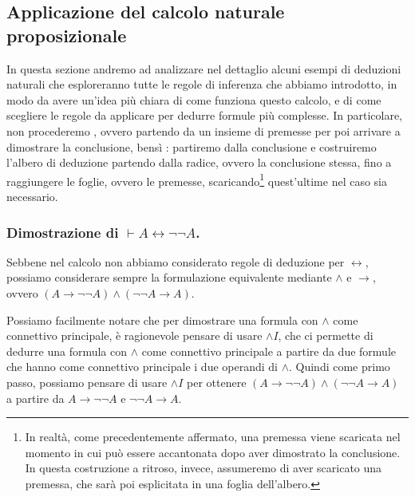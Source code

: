 \subsection{Applicazione del calcolo naturale proposizionale}

In questa sezione andremo ad analizzare nel dettaglio alcuni esempi di deduzioni naturali che esploreranno tutte le regole di inferenza che abbiamo introdotto, in modo da avere un'idea più chiara di come funziona questo calcolo, e di come scegliere le regole da applicare per dedurre formule più complesse.
In particolare, non procederemo , ovvero partendo da un insieme di premesse per poi arrivare a dimostrare la conclusione, bensì : partiremo dalla conclusione e costruiremo l'albero di deduzione partendo dalla radice, ovvero la conclusione stessa, fino a raggiungere le foglie, ovvero le premesse, scaricando\footnote{In realtà, come precedentemente affermato, una premessa viene scaricata nel momento in cui può essere accantonata dopo aver dimostrato la conclusione. In questa costruzione a ritroso, invece, assumeremo di aver scaricato una premessa, che sarà poi esplicitata in una foglia dell'albero.} quest'ultime nel caso sia necessario.

\subsubsection*{Dimostrazione di \(\vdash A \leftrightarrow \neg \neg A\).}


Sebbene nel calcolo non abbiamo considerato regole di deduzione per \(\leftrightarrow\), possiamo considerare sempre la formulazione equivalente mediante \(\land\) e \(\to\), ovvero \((A \to \neg \neg A) \land (\neg \neg A \to A)\).

Possiamo facilmente notare che per dimostrare una formula con \(\land\) come connettivo principale, è ragionevole pensare di usare \(\land I\), che ci permette di dedurre una formula con \(\land\) come connettivo principale a partire da due formule che hanno come connettivo principale i due operandi di \(\land\). Quindi come primo passo, possiamo pensare di usare \(\land I\) per ottenere \((A \to \neg \neg A) \land (\neg \neg A \to A)\) a partire da \(A \to \neg \neg A\) e \(\neg \neg A \to A\).

\begin{prooftree}
\end{prooftree}

